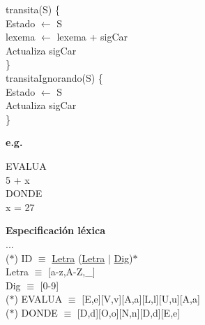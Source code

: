 \documentclass[\main/Apuntes_PL.tex]{subfiles}
\begin{document}
      \vspace{10mm}
      \hspace{5mm}transita(S) \{\\
      \hspace{10mm}Estado $\leftarrow$ S\\
      \hspace{10mm}lexema $\leftarrow$ lexema + sigCar\\
      \hspace{10mm}Actualiza sigCar\\
      \hspace{5mm}\}\\
      \vspace{10mm}
      \hspace{5mm}transitaIgnorando(S) \{\\
      \hspace{10mm}Estado $\leftarrow$ S\\
      \hspace{10mm}Actualiza sigCar\\
      \hspace{5mm}\}

      \newpage
      \par
      \textbf{e.g.}
      \begin{center}
        \begin{minipage}{.2 \textwidth}
          EVALUA\\
          5 + x\\
          DONDE\\
          x = 27
        \end{minipage}%
        \begin{minipage}{.5 \textwidth}
          \par
          \textbf{Especificación léxica}\\
          \vspace{2mm}
          \hspace{5mm}...\\
          \hspace{5mm}($\ast$) ID $\equiv$ \underline{Letra} (\underline{Letra} $\mid$ \underline{Dig})$\ast$\\
          \hspace{11mm}Letra $\equiv$ $[$a-z,A-Z,\_]\\
          \hspace{11mm}Dig $\equiv$ $[$0-9]\\
          \hspace{5mm}($\ast$) EVALUA $\equiv$ [E,e][V,v][A,a][L,l][U,u][A,a]\\
          \hspace{5mm}($\ast$) DONDE $\equiv$ [D,d][O,o][N,n][D,d][E,e]\\
        \end{minipage}
      \end{center}
\end{document}
